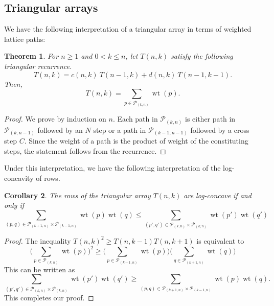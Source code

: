 \documentclass{article}
\newcommand{\lp}{\mathcal{P}}
\DeclareMathOperator{\wt}{wt}
\newtheorem{theorem}{Theorem}[section]
\newtheorem{corollary}[theorem]{Corollary}
\theoremstyle{definition}
\numberwithin{equation}{section}
\begin{document}
\subsection{Triangular arrays}
We have the following interpretation of a triangular array in terms of weighted lattice paths:
\begin{theorem}
    For $n\ge 1$ and $0<k \le n$, let $T(n,k)$ satisfy the following triangular recurrence.
    \begin{equation*}
        T(n,k)=c(n,k)\ T(n-1,k)+d(n,k)\ T(n-1,k-1).
    \end{equation*}
Then,
    \begin{equation*}
        T(n,k)=\displaystyle \sum_{p \in \lp_{(k,n)}} \wt(p).
    \end{equation*}
\end{theorem}
\begin{proof}
    We prove by induction on $n$. Each path in $\lp_{(k,n)}$ is either path in $\lp_{(k,n-1)}$ followed by an $N$ step or a path in $\lp_{(k-1,n-1)}$ followed by a cross step $C$. Since the weight of a path is the product of weight of the constituting steps, the statement follows from the recurrence.
    \end{proof}

Under this interpretation, we have the following interpretation of the log-concavity of rows.
\begin{corollary}
    The rows of the triangular array $T(n,k)$ are log-concave if and only if
\begin{equation*}
    \displaystyle \sum_{(p,q)\in \lp_{(k+1,n)}\times \lp_{(k-1,n)}} \wt(p)\wt(q) \le \displaystyle \sum_{(p',q')\in \lp_{(k,n)}\times \lp_{(k,n)}} \wt(p')\wt(q')
\end{equation*}
\end{corollary}
\begin{proof}
    The inequality $T(n,k)^2\ge T(n,k-1)T(n,k+1)$ is equivalent to \begin{equation*}
    \bigg(\displaystyle \sum_{p \in \lp_{(k,n)}} \wt(p)\bigg)^2 \ge \bigg( \displaystyle \sum_{p\in \lp_{(k-1,n)}} \wt(p)\bigg) \bigg(\displaystyle \sum_{q\in \lp_{(k+1,n)}} \wt(q)\bigg)
\end{equation*}
This can be written as 
\begin{equation*}
    \displaystyle \sum_{(p',q')\in \lp_{(k,n)}\times \lp_{(k,n)}} \wt(p')\wt(q') \ge \displaystyle \sum_{(p,q)\in \lp_{(k+1,n)}\times \lp_{(k-1,n)}} \wt(p)\wt(q). 
\end{equation*}
This completes our proof.
\end{proof}
\end{document}
